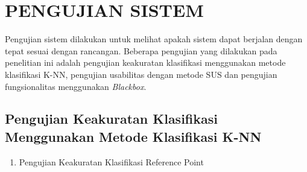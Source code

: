 \section{\uppercase{PENGUJIAN SISTEM}}
\par Pengujian sistem dilakukan untuk melihat apakah sistem dapat berjalan dengan tepat sesuai dengan rancangan. Beberapa pengujian yang dilakukan pada penelitian ini adalah pengujian keakuratan klasifikasi menggunakan metode klasifikasi K-NN, pengujian usabilitas dengan metode SUS dan pengujian fungsionalitas menggunakan \textit{Blackbox}.

\subsection{Pengujian Keakuratan Klasifikasi Menggunakan Metode Klasifikasi K-NN}
\begin{enumerate}

	\item Pengujian Keakuratan Klasifikasi Reference Point


\end{enumerate}
